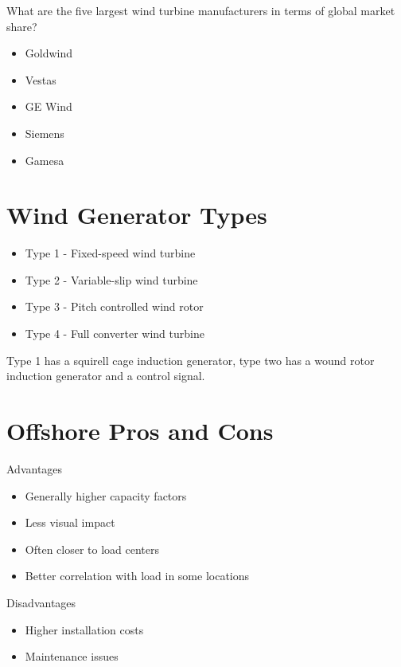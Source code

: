 \documentclass[12pt, a4paper]{report}
\begin{document}
  What are the five largest wind turbine manufacturers in terms of global market share?

  \begin{itemize}
    \item Goldwind
    \item Vestas
    \item GE Wind
    \item Siemens
    \item Gamesa
  \end{itemize}

  \section{Wind Generator Types}

  \begin{itemize}
    \item Type 1 - Fixed-speed wind turbine
    \item Type 2 - Variable-slip wind turbine
    \item Type 3 - Pitch controlled wind rotor
    \item Type 4 - Full converter wind turbine
  \end{itemize}

  Type 1 has a squirell cage induction generator, type two has a wound rotor induction generator and a control signal.

  \section{Offshore Pros and Cons}

  Advantages

  \begin{itemize}
    \item Generally higher capacity factors
    \item Less visual impact
    \item Often closer to load centers
    \item Better correlation with load in some locations
  \end{itemize}

  Disadvantages

  \begin{itemize}
    \item Higher installation costs
    \item Maintenance issues
  \end{itemize}
\end{document}

